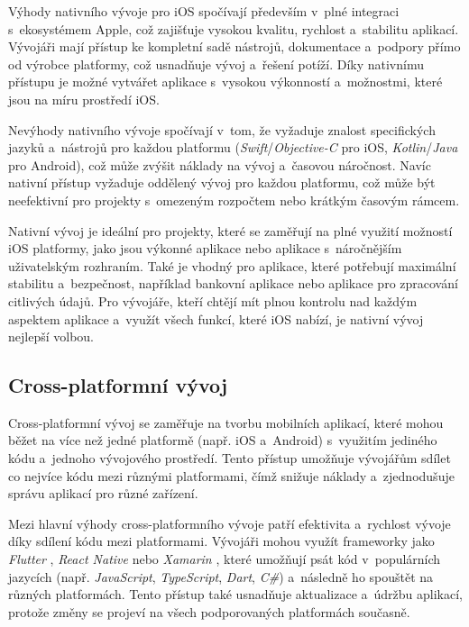 Výhody nativního vývoje pro iOS spočívají především v~plné integraci s~ekosystémem Apple, což zajišťuje vysokou kvalitu, rychlost a~stabilitu aplikací. Vývojáři mají přístup ke kompletní sadě nástrojů, dokumentace a~podpory přímo od výrobce platformy, což usnadňuje vývoj a~řešení potíží. Díky nativnímu přístupu je možné vytvářet aplikace s~vysokou výkonností a~možnostmi, které jsou na míru prostředí iOS.

Nevýhody nativního vývoje spočívají v~tom, že vyžaduje znalost specifických jazyků a~nástrojů pro každou platformu (\emph{Swift}/\emph{Objective-C} pro iOS, \emph{Kotlin}/\emph{Java} pro Android), což může zvýšit náklady na vývoj a~časovou náročnost. Navíc nativní přístup vyžaduje oddělený vývoj pro každou platformu, což může být neefektivní pro projekty s~omezeným rozpočtem nebo krátkým časovým rámcem.

Nativní vývoj je ideální pro projekty, které se zaměřují na plné využití možností iOS platformy, jako jsou výkonné aplikace nebo aplikace s~náročnějším uživatelským rozhraním. Také je vhodný pro aplikace, které potřebují maximální stabilitu a~bezpečnost, například bankovní aplikace nebo aplikace pro zpracování citlivých údajů. Pro vývojáře, kteří chtějí mít plnou kontrolu nad každým aspektem aplikace a~využít všech funkcí, které iOS nabízí, je nativní vývoj nejlepší volbou.

\subsection{Cross-platformní vývoj}

Cross-platformní vývoj se zaměřuje na tvorbu mobilních aplikací, které mohou běžet na více než jedné platformě (např. iOS a~Android) s~využitím jediného kódu a~jednoho vývojového prostředí. Tento přístup umožňuje vývojářům sdílet co nejvíce kódu mezi různými platformami, čímž snižuje náklady a~zjednodušuje správu aplikací pro různé zařízení.

Mezi hlavní výhody cross-platformního vývoje patří efektivita a~rychlost vývoje díky sdílení kódu mezi platformami. Vývojáři mohou využít frameworky jako \emph{Flutter} \cite{flutter-cross-platform}, \emph{React Native} \cite{react-native-cross-platform} nebo \emph{Xamarin} \cite{xamarin-cross-platform}, které umožňují psát kód v~populárních jazycích (např. \emph{JavaScript}, \emph{TypeScript}, \emph{Dart}, \emph{C\#}) a~následně ho spouštět na různých platformách. Tento přístup také usnadňuje aktualizace a~údržbu aplikací, protože změny se projeví na všech podporovaných platformách současně.

